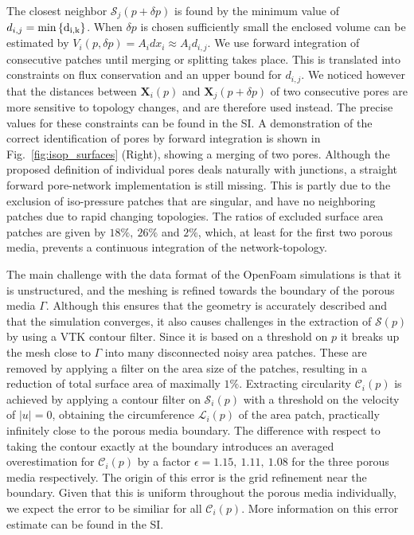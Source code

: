 \documentclass[draft]{agujournal2019}
\begin{document}
The closest neighbor $\mathcal{S}_j(p+\delta p)$ is found by the minimum value of $d_{i,j} = \rm{min}\left\{ d_{i,k}\right\}$. When $\delta p$ is chosen sufficiently small the enclosed volume can be estimated by $V_i(p,\delta p)=A_id x_i \approx A_i d_{i,j}$. We use forward integration of consecutive patches until merging or splitting takes place. This is translated into constraints on flux conservation and an upper bound for $d_{i,j}$. We noticed however that the distances between $\mathbf{X}_i(p)$ and $\mathbf{X}_j(p+\delta p)$ of two consecutive pores are more sensitive to topology changes, and are therefore used instead. The precise values for these constraints can be found in the SI. A demonstration of the correct identification of pores by forward integration is shown in Fig.~\ref{fig:isop_surfaces} (Right), showing a merging of two pores. Although the proposed definition of individual pores deals naturally with junctions, a straight forward pore-network implementation is still missing. This is partly due to the exclusion of iso-pressure patches that are singular, and have no neighboring patches due to rapid changing topologies. The ratios of excluded surface area patches are given by $18 \%,~26 \%$ and $2\%$, which, at least for the first two porous media, prevents a continuous integration of the network-topology.

The main challenge with the data format of the OpenFoam simulations is that it is unstructured, and the meshing is refined towards the boundary of the porous media $\Gamma$. Although this ensures that the geometry is accurately described and that the simulation converges, it also causes challenges in the extraction of $\mathcal{S}(p)$ by using a VTK contour filter. Since it is based on a threshold on $p$ it breaks up the mesh close to $\Gamma$ into many disconnected noisy area patches. These are removed by applying a filter on the area size of the patches, resulting in a reduction of total surface area of maximally $1\%$. Extracting circularity $\mathcal{C}_i(p)$ is achieved by applying a contour filter on $\mathcal{S}_i(p)$ with a threshold on the velocity of $|u| = 0 $, obtaining the circumference $\mathcal{L}_i(p)$ of the area patch, practically infinitely close to the porous media boundary. The difference with respect to taking the contour exactly at the boundary introduces an averaged overestimation for $\mathcal{C}_i(p)$ by a factor $\epsilon = 1.15,~1.11,~1.08$ for the three porous media respectively. The origin of this error is the grid refinement near the boundary. Given that this is uniform throughout the porous media individually, we expect the error to be similiar for all $\mathcal{C}_i(p)$. More information on this error estimate can be found in the SI. 
\end{document}
